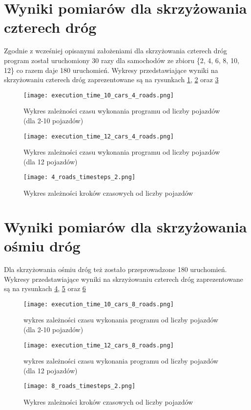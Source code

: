 \section{Wyniki pomiarów dla skrzyżowania czterech dróg}

Zgodnie z wcześniej opisanymi założeniami dla skrzyżowania czterech dróg program został uruchomiony 30 razy dla samochodów ze zbioru \{2, 4, 6, 8, 10, 12\} co razem daje 180 uruchomień.
\newline
\newline
Wykresy przedstawiające wyniki na skrzyżowaniu czterech dróg zaprezentowane są na rysunkach \ref{execution_time_10_cars_4_roads}, \ref{execution_time_12_cars_4_roads} oraz \ref{four-roads-crossroads-timesteps}
\begin{figure}[H]
  \texttt{[image: execution\_time\_10\_cars\_4\_roads.png]}
  \caption{Wykres zależności czasu wykonania programu od liczby pojazdów (dla 2-10 pojazdów)}
  \label{execution_time_10_cars_4_roads}
\end{figure}
\begin{figure}[H]
  \texttt{[image: execution\_time\_12\_cars\_4\_roads.png]}
  \caption{Wykres zależności czasu wykonania programu od liczby pojazdów (dla 12 pojazdów)}
  \label{execution_time_12_cars_4_roads}
\end{figure}
\begin{figure}[H]
  \texttt{[image: 4\_roads\_timesteps\_2.png]}
  \caption{Wykres zależności kroków czasowych od liczby pojazdów}
  \label{four-roads-crossroads-timesteps}
\end{figure}

\section{Wyniki pomiarów dla skrzyżowania ośmiu dróg}

Dla skrzyżowania ośmiu dróg też zostało przeprowadzone 180 uruchomień.
\newline
\newline
Wykresy przedstawiające wyniki na skrzyżowaniu czterech dróg zaprezentowane są na rysunkach \ref{execution_time_10_cars_8_roads}, \ref{execution_time_12_cars_8_roads} oraz \ref{eight-roads-crossroads-timesteps}
\begin{figure}[H]
    \texttt{[image: execution\_time\_10\_cars\_8\_roads.png]}
  \caption{wykres zależności czasu wykonania programu od liczby pojazdów (dla 2-10 pojazdów)}
  \label{execution_time_10_cars_8_roads}
\end{figure}
\begin{figure}[H]
    \texttt{[image: execution\_time\_12\_cars\_8\_roads.png]}
  \caption{wykres zależności czasu wykonania programu od liczby pojazdów (dla 12 pojazdów)}
  \label{execution_time_12_cars_8_roads}
\end{figure}
\begin{figure}[H]
    \texttt{[image: 8\_roads\_timesteps\_2.png]}
  \caption{Wykres zależności kroków czasowych od liczby pojazdów}
  \label{eight-roads-crossroads-timesteps}
\end{figure}

